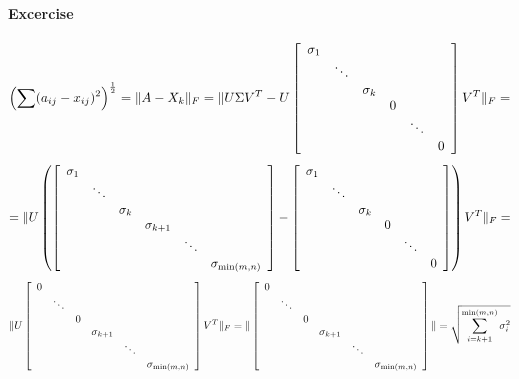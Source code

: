 \documentclass[10pt]{report}
\begin{document}
\paragraph{Excercise}
$$\left(\sum(a_{ij}-x_{ij})^2\right)^{\frac{1}{2}} = \|A-X_k\|_F=\|U\Sigma V^T-U\left[\begin{array}{c c c c c c}
\sigma_1\\
&\ddots\\
&&\sigma_k\\
&&&0\\
&&&&\ddots\\
&&&&&0
\end{array}\right]V^T\|_F=$$
$$=\|U\left(\left[\begin{array}{c c c c c c}
\sigma_1\\
&\ddots\\
&&\sigma_k\\
&&&\sigma_{k+1}\\
&&&&\ddots\\
&&&&&\sigma_{\min(m,n)}
\end{array}\right]-\left[\begin{array}{c c c c c c}
\sigma_1\\
&\ddots\\
&&\sigma_k\\
&&&0\\
&&&&\ddots\\
&&&&&0
\end{array}\right]\right)V^T\|_F=$$
$$\|U\left[\begin{array}{c c c c c c}
0\\
&\ddots\\
&&0\\
&&&\sigma_{k+1}\\
&&&&\ddots\\
&&&&&\sigma_{\min(m,n)}
\end{array}\right]V^T\|_F=\|\left[\begin{array}{c c c c c c}
0\\
&\ddots\\
&&0\\
&&&\sigma_{k+1}\\
&&&&\ddots\\
&&&&&\sigma_{\min(m,n)}
\end{array}\right]\|=\sqrt{\sum_{i=k+1}^{\min(m,n)}\sigma_i^2}$$
\end{document}
